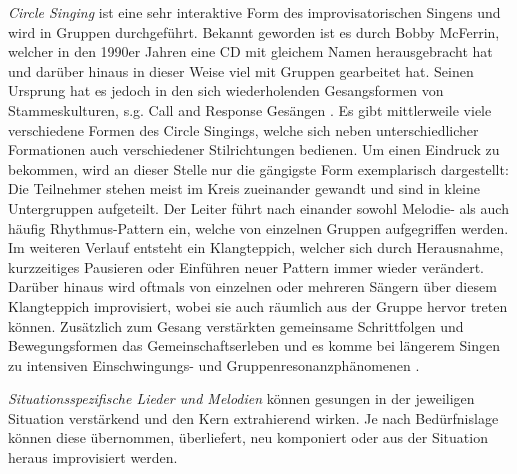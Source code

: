 \emph{Circle Singing} ist eine sehr interaktive Form des improvisatorischen Singens und wird in Gruppen durchgeführt. Bekannt geworden ist es durch Bobby McFerrin, welcher in den 1990er Jahren eine CD mit gleichem Namen herausgebracht hat und darüber hinaus in dieser Weise viel mit Gruppen gearbeitet hat. Seinen Ursprung hat es jedoch in den sich wiederholenden Gesangsformen von Stammeskulturen, s.g. Call and Response Gesängen \autocite[vgl.][280]{bossinger2006}. Es gibt mittlerweile viele verschiedene Formen des Circle Singings, welche sich neben unterschiedlicher Formationen auch verschiedener Stilrichtungen bedienen. Um einen Eindruck zu bekommen, wird an dieser Stelle nur die gängigste Form exemplarisch dargestellt: Die Teilnehmer stehen meist im Kreis zueinander gewandt und sind in kleine Untergruppen aufgeteilt. Der Leiter führt nach einander sowohl Melodie- als auch häufig Rhythmus-Pattern ein, welche von einzelnen Gruppen aufgegriffen werden. Im weiteren Verlauf entsteht ein Klangteppich, welcher sich durch Herausnahme, kurzzeitiges Pausieren oder Einführen neuer Pattern immer wieder verändert. Darüber hinaus wird oftmals von einzelnen oder mehreren Sängern über diesem Klangteppich improvisiert, wobei sie auch räumlich aus der Gruppe hervor treten können. Zusätzlich zum Gesang verstärkten gemeinsame Schrittfolgen und Bewegungsformen das Gemeinschaftserleben und es komme bei längerem Singen zu intensiven Einschwingungs- und Gruppenresonanzphänomenen \autocite[vgl.][281]{bossinger2006}.

\emph{Situationsspezifische Lieder und Melodien} können gesungen in der jeweiligen Situation verstärkend und den Kern extrahierend wirken. Je nach Bedürfnislage können diese übernommen, überliefert, neu komponiert oder aus der Situation heraus improvisiert werden.

